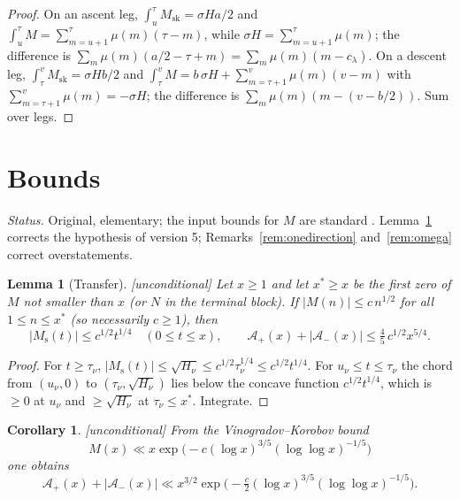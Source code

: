 \documentclass[11pt]{amsart}
\numberwithin{equation}{section}
\theoremstyle{plain}
\newtheorem{lemma}[theorem]{Lemma}
\newtheorem{corollary}[theorem]{Corollary}
\theoremstyle{definition}
\theoremstyle{remark}
\newcommand{\Ms}{M_{\mathrm{s}}}
\newcommand{\Msk}{M_{\mathrm{sk}}}
\newcommand{\Ap}{\mathcal{A}_{+}}
\newcommand{\Am}{\mathcal{A}_{-}}
\begin{document}
\begin{proof}
On an ascent leg, $\int_{u}^{\tau}\Msk=\sigma H a/2$ and
$\int_u^\tau M=\sum_{m=u+1}^{\tau}\mu(m)(\tau-m)$, while
$\sigma H=\sum_{m=u+1}^{\tau}\mu(m)$; the difference is
$\sum_m\mu(m)(a/2-\tau+m)=\sum_m\mu(m)(m-c_\lambda)$. On a descent leg,
$\int_\tau^v\Msk=\sigma Hb/2$ and
$\int_\tau^vM=b\,\sigma H+\sum_{m=\tau+1}^{v}\mu(m)(v-m)$ with
$\sum_{m=\tau+1}^{v}\mu(m)=-\sigma H$; the difference is
$\sum_m\mu(m)(m-(v-b/2))$. Sum over legs.
\end{proof}

\section{Bounds}
\label{sec:bounds}

\noindent\emph{Status.} Original, elementary; the input bounds for $M$ are
standard \cite{Walfisz1963,OdlyzkoTeRiele1985,KotnikTeRiele2006}.
Lemma~\ref{lem:transfer} corrects the hypothesis of version 5;
Remarks~\ref{rem:onedirection} and~\ref{rem:omega} correct overstatements.

\begin{lemma}[Transfer]
\label{lem:transfer}
\emph{[unconditional]} Let $x\ge1$ and let $x^*\ge x$ be the first zero of
$M$ not smaller than $x$ (or $N$ in the terminal block). If
$|M(n)|\le c\,n^{1/2}$ for all $1\le n\le x^*$ (so necessarily $c\ge1$),
then
\begin{equation}
\label{eq:transfer_bound}
  |\Ms(t)|\le c^{1/2}t^{1/4}\quad(0\le t\le x),\qquad
  \Ap(x)+|\Am(x)|\le\tfrac45\,c^{1/2}x^{5/4}.
\end{equation}
\end{lemma}

\begin{proof}
For $t\ge\tau_\nu$, $|\Ms(t)|\le\sqrt{H_\nu}\le c^{1/2}\tau_\nu^{1/4}\le
c^{1/2}t^{1/4}$. For $u_\nu\le t\le\tau_\nu$ the chord from $(u_\nu,0)$ to
$(\tau_\nu,\sqrt{H_\nu})$ lies below the concave function $c^{1/2}t^{1/4}$,
which is $\ge0$ at $u_\nu$ and $\ge\sqrt{H_\nu}$ at $\tau_\nu\le x^*$.
Integrate.
\end{proof}

\begin{corollary}
\label{cor:uncond}
\emph{[unconditional]} From the Vinogradov--Korobov bound
\cite{Walfisz1963}
\begin{equation}
\label{eq:VK_M}
  M(x)\ll x\exp\bigl(-c(\log x)^{3/5}(\log\log x)^{-1/5}\bigr)
\end{equation}
one obtains
\begin{equation}
\label{eq:uncond_area}
  \Ap(x)+|\Am(x)|\ll x^{3/2}\exp\bigl(-\tfrac c2(\log x)^{3/5}(\log\log x)^{-1/5}\bigr).
\end{equation}
\end{corollary}
\end{document}
